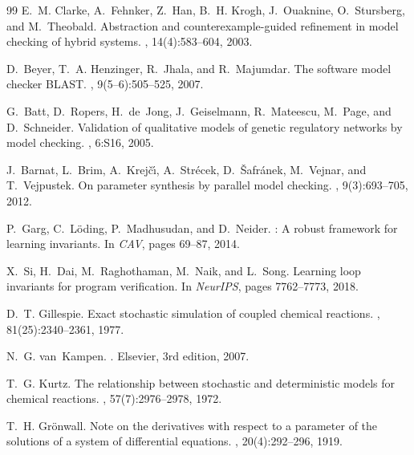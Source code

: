 \documentclass[11pt]{article}
\begin{document}
\begin{thebibliography}{99}
E.~M. Clarke, A.~Fehnker, Z.~Han, B.~H. Krogh, J.~Ouaknine, O.~Stursberg,
  and M.~Theobald.
\newblock Abstraction and counterexample-guided refinement in model checking of
  hybrid systems.
, 14(4):583--604, 2003.

D.~Beyer, T.~A. Henzinger, R.~Jhala, and R.~Majumdar.
\newblock The software model checker {BLAST}.
, 9(5--6):505--525, 2007.

G.~Batt, D.~Ropers, H.~de~Jong, J.~Geiselmann, R.~Mateescu, M.~Page, and
  D.~Schneider.
\newblock Validation of qualitative models of genetic regulatory networks by
  model checking.
, 6:S16, 2005.

J.~Barnat, L.~Brim, A.~Krej{\v{c}}{\'\i}, A.~Str{\'e}cek, D.~{\v{S}}afr{\'a}nek,
  M.~Vejnar, and T.~Vejpustek.
\newblock On parameter synthesis by parallel model checking.
, 9(3):693--705, 2012.

P.~Garg, C.~L{\"o}ding, P.~Madhusudan, and D.~Neider.
: A robust framework for learning invariants.
\newblock In {\em CAV}, pages 69--87, 2014.

X.~Si, H.~Dai, M.~Raghothaman, M.~Naik, and L.~Song.
\newblock Learning loop invariants for program verification.
\newblock In {\em NeurIPS}, pages 7762--7773, 2018.

D.~T. Gillespie.
\newblock Exact stochastic simulation of coupled chemical reactions.
, 81(25):2340--2361, 1977.

N.~G. van~Kampen.
.
\newblock Elsevier, 3rd edition, 2007.

T.~G. Kurtz.
\newblock The relationship between stochastic and deterministic models for
  chemical reactions.
, 57(7):2976--2978, 1972.

T.~H. Gr{\"o}nwall.
\newblock Note on the derivatives with respect to a parameter of the solutions
  of a system of differential equations.
, 20(4):292--296, 1919.

\end{thebibliography}
\end{document}
